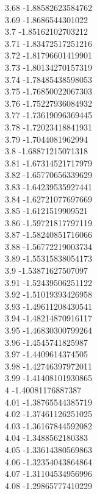 {3.68	-1.88582623584762\\
3.69	-1.8686544301022\\
3.7	-1.85162102703212\\
3.71	-1.83472517251216\\
3.72	-1.81796601419901\\
3.73	-1.80134270157319\\
3.74	-1.78485438598053\\
3.75	-1.76850022067303\\
3.76	-1.75227936084932\\
3.77	-1.73619096369445\\
3.78	-1.72023418841931\\
3.79	-1.7044081962994\\
3.8	-1.68871215071318\\
3.81	-1.67314521717979\\
3.82	-1.65770656339629\\
3.83	-1.64239535927441\\
3.84	-1.62721077697669\\
3.85	-1.6121519909521\\
3.86	-1.59721817797119\\
3.87	-1.58240851716066\\
3.88	-1.56772219003734\\
3.89	-1.55315838054173\\
3.9	-1.53871627507097\\
3.91	-1.52439506251122\\
3.92	-1.51019393426958\\
3.93	-1.49611208430541\\
3.94	-1.48214870916117\\
3.95	-1.46830300799264\\
3.96	-1.4545741825987\\
3.97	-1.4409614374505\\
3.98	-1.42746397972011\\
3.99	-1.41408101930865\\
4	-1.40081176887387\\
4.01	-1.38765544385719\\
4.02	-1.37461126251025\\
4.03	-1.36167844592082\\
4.04	-1.3488562180383\\
4.05	-1.33614380569863\\
4.06	-1.32354043864864\\
4.07	-1.31104534956996\\
4.08	-1.29865777410229\\
}
